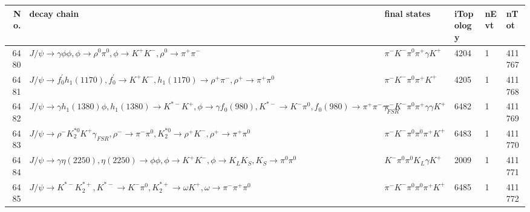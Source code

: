 \begin{table}[htbp] 
\begin{center}
\begin{small}
\begin{tabular}{rlllll}\hline\hline
 No. & decay chain & final states &  iTopology & nEvt & nTot \\\hline
6480&$J/\psi       \rightarrow \gamma       \phi           \phi           , \phi            \rightarrow \rho^{0}      \pi^{0}        , \phi            \rightarrow K^{+}          K^{-}          , \rho^{0}       \rightarrow \pi^{+}        \pi^{-}        $&$\pi^{-}        K^{-}          \pi^{0}        \pi^{+}        \gamma       K^{+}          $& 4204&    1&411767\\
6481&$J/\psi       \rightarrow f^{'}_{0}     h_{1}(1170)    , f^{'}_{0}      \rightarrow K^{+}          K^{-}          , h_{1}(1170)     \rightarrow \rho^{+}      \pi^{-}        , \rho^{+}       \rightarrow \pi^{+}        \pi^{0}        $&$\pi^{-}        K^{-}          \pi^{0}        \pi^{+}        K^{+}          $& 4205&    1&411768\\
6482&$J/\psi       \rightarrow \gamma       h_{1}(1380)    \phi           , h_{1}(1380)     \rightarrow K^{*-}         K^{+}          , \phi            \rightarrow \gamma       f_{0}(980)     , K^{*-}          \rightarrow K^{-}          \pi^{0}        , f_{0}(980)      \rightarrow \pi^{+}        \pi^{-}        \gamma_{FSR} $&$\pi^{-}        K^{-}          \pi^{0}        \pi^{+}        \gamma       \gamma       K^{+}          $& 6482&    1&411769\\
6483&$J/\psi       \rightarrow \rho^{-}      K_2^{*0}       K^{+}          \gamma_{FSR} , \rho^{-}       \rightarrow \pi^{-}        \pi^{0}        , K_2^{*0}        \rightarrow \rho^{+}      K^{-}          , \rho^{+}       \rightarrow \pi^{+}        \pi^{0}        $&$\pi^{-}        K^{-}          \pi^{0}        \pi^{0}        \pi^{+}        K^{+}          $& 6483&    1&411770\\
6484&$J/\psi       \rightarrow \gamma       \eta(2250)    , \eta(2250)     \rightarrow \phi           \phi           , \phi            \rightarrow K^{+}          K^{-}          , \phi            \rightarrow K_{L}          K_{S}          , K_{S}           \rightarrow \pi^{0}        \pi^{0}        $&$K^{-}          \pi^{0}        \pi^{0}        K_{L}          \gamma       K^{+}          $& 2009&    1&411771\\
6485&$J/\psi       \rightarrow K^{*-}         K_2^{*+}       , K^{*-}          \rightarrow K^{-}          \pi^{0}        , K_2^{*+}        \rightarrow \omega         K^{+}          , \omega          \rightarrow \pi^{-}        \pi^{+}        \pi^{0}        $&$\pi^{-}        K^{-}          \pi^{0}        \pi^{0}        \pi^{+}        K^{+}          $& 6485&    1&411772\\

\end{tabular}
\end{small}
\end{center}
\end{table}
